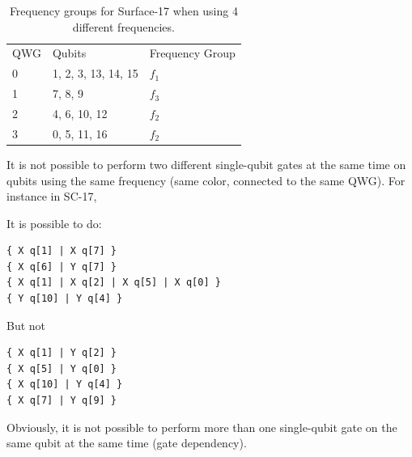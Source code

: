 \documentclass[11pt]{article}
\begin{document}
\begin{table}[h!]


\caption{\label{T3}
Frequency groups for Surface-17 when using 4 different frequencies.}
\centering
\begin{tabular}{lll}
 & \\
\hline
QWG & Qubits & Frequency Group\\
\hline
\cellcolor{red!25}  0 & \cellcolor{red!25} 1, 2, 3, 13, 14, 15 & \cellcolor{red!25} $f_1$\\
\cellcolor{pink!25}  1 & \cellcolor{pink!25} 7, 8, 9 & \cellcolor{pink!25} $f_3$\\
\cellcolor{green!25}  2 & \cellcolor{green!25} 4, 6, 10, 12 & \cellcolor{green!25} $f_2$\\
\cellcolor{cyan!25}  3 & \cellcolor{cyan!25} 0, 5, 11, 16 & \cellcolor{cyan!25} $f_2$\\
\hline
\end{tabular}
\end{table}


\newpage
It is not possible to perform two different single-qubit gates at the same time on qubits using the same frequency (same color, connected to the same QWG). For instance in SC-17,

\begin{minipage}[t]{.45\textwidth}

It is possible to do:

\begin{verbatim}
{ X q[1] | X q[7] }
{ X q[6] | Y q[7] }
{ X q[1] | X q[2] | X q[5] | X q[0] }
{ Y q[10] | Y q[4] }

\end{verbatim}

\end{minipage}
\hfill %
\begin{minipage}[t]{.45\textwidth}

But not

\begin{verbatim}
{ X q[1] | Y q[2] }
{ X q[5] | Y q[0] }
{ X q[10] | Y q[4] }
{ X q[7] | Y q[9] }
\end{verbatim}

\end{minipage}

Obviously, it is not possible to perform more than one single-qubit gate on the same qubit at the same time (gate dependency).
\end{document}

